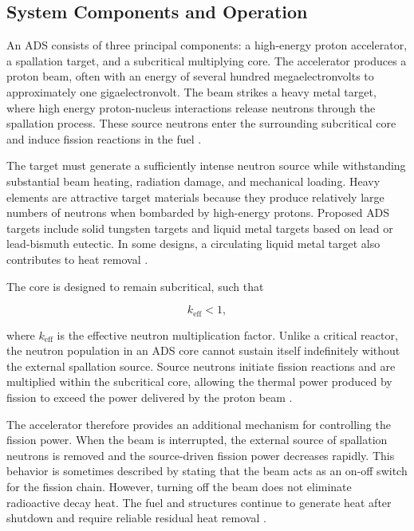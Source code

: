 \subsection{System Components and Operation}
\label{subsec:ads-components}

An \gls{ADS} consists of three principal components: a high-energy proton
accelerator, a spallation target, and a subcritical multiplying core. The
accelerator produces a proton beam, often with an energy of several hundred
megaelectronvolts to approximately one gigaelectronvolt. The beam strikes a
heavy metal target, where high energy proton-nucleus interactions release
neutrons through the spallation process. These source neutrons enter the
surrounding subcritical core and induce fission reactions in the fuel
\cite{aitabderrahim_myrrha_2001,nea_ads_components_2010}.

The target must generate a sufficiently intense neutron source while
withstanding substantial beam heating, radiation damage, and mechanical
loading. Heavy elements are attractive target materials because they produce
relatively large numbers of neutrons when bombarded by high-energy protons.
Proposed \gls{ADS} targets include solid tungsten targets and liquid metal targets
based on lead or lead-bismuth eutectic. In some designs, a circulating
liquid metal target also contributes to heat removal
\cite{aitabderrahim_myrrha_2001,nea_ads_components_2010}.

The core is designed to remain subcritical, such that

\begin{equation}
    k_{\mathrm{eff}} < 1,
\end{equation}

where \(k_{\mathrm{eff}}\) is the effective neutron multiplication factor.
Unlike a critical reactor, the neutron population in an \gls{ADS} core cannot
sustain itself indefinitely without the external spallation source. Source
neutrons initiate fission reactions and are multiplied within the subcritical
core, allowing the thermal power produced by fission to exceed the power
delivered by the proton beam
\cite{eriksson_ads_safety_2004,nea_ads_components_2010}.

The accelerator therefore provides an additional mechanism for controlling
the fission power. When the beam is interrupted, the external source of
spallation neutrons is removed and the source-driven fission power decreases
rapidly. This behavior is sometimes described by stating that the beam acts
as an on-off switch for the fission chain. However, turning off the beam
does not eliminate radioactive decay heat. The fuel and structures continue
to generate heat after shutdown and require reliable residual heat removal
\cite{eriksson_ads_safety_2004}.

